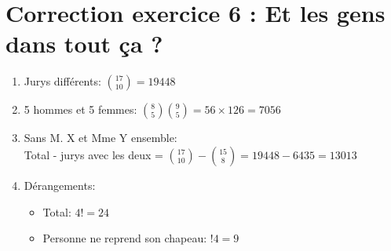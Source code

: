 \section*{Correction exercice 6 : Et les gens dans tout ça ?}

\begin{enumerate}
    \item Jurys différents: \(\binom{17}{10} = 19448\)
    \item 5 hommes et 5 femmes: \(\binom{8}{5}\binom{9}{5} = 56 \times 126 = 7056\)
    \item Sans M. X et Mme Y ensemble:\\
    Total - jurys avec les deux = \(\binom{17}{10} - \binom{15}{8} = 19448 - 6435 = 13013\)
    \item Dérangements:
    \begin{itemize}
        \item Total: \(4! = 24\)
        \item Personne ne reprend son chapeau: \(!4 = 9\)
    \end{itemize}
\end{enumerate}
